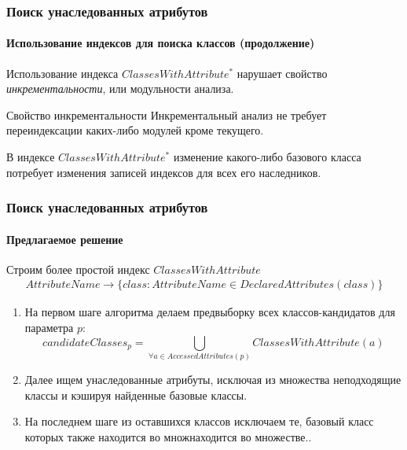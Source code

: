 \documentclass[handout]{beamer}
\begin{document}
\begin{frame}
  \frametitle{Поиск унаследованных атрибутов}
  \framesubtitle{Использование индексов для поиска классов (продолжение)}

  Использование индекса $ClassesWithAttribute^*$ нарушает свойство
  \emph{инкрементальности}, или модульности анализа.

  \begin{block}{Свойство инкрементальности}
    Инкрементальный анализ не требует переиндексации каких-либо модулей
    кроме текущего.
  \end{block}

  В индексе $ClassesWithAttribute^*$ изменение какого-либо базового класса
  потребует изменения записей индексов для всех его наследников.
\end{frame}

\begin{frame}
  \frametitle{Поиск унаследованных атрибутов}
  \framesubtitle{Предлагаемое решение}

  Строим более простой индекс $ClassesWithAttribute$
  \begin{multline*}
    AttributeName \rightarrow \{class: AttributeName \in DeclaredAttributes(class) \}
  \end{multline*}

  \begin{enumerate}
    \item На первом шаге алгоритма делаем предвыборку всех классов-кандидатов для
      параметра $p$:  
      \[
        candidateClasses_p = \bigcup\limits_{\forall{a} \in AccessedAttributes(p)}
        ClassesWithAttribute(a)
      \]

    \item Далее ищем унаследованные атрибуты, исключая из множества неподходящие классы
      и кэшируя найденные базовые классы.

    \item На последнем шаге из оставшихся классов исключаем те, базовый класс
      которых также находится во множнаходится во множестве..
  \end{enumerate}
\end{frame}
\end{document}
